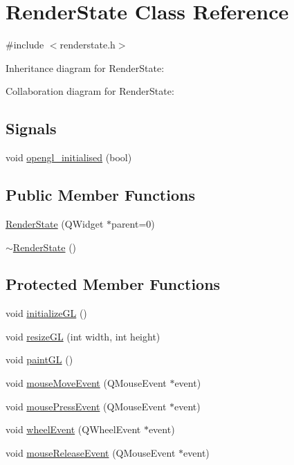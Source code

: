 \hypertarget{class_render_state}{}\section{Render\+State Class Reference}
\label{class_render_state}


{\ttfamily \#include $<$renderstate.\+h$>$}



Inheritance diagram for Render\+State\+:


Collaboration diagram for Render\+State\+:
\subsection*{Signals}
\begin{DoxyCompactItemize}
\item 
void \hyperlink{class_render_state_a1218388c554d57a0d0f3329fb598c52c}{opengl\+\_\+initialised} (bool)
\end{DoxyCompactItemize}
\subsection*{Public Member Functions}
\begin{DoxyCompactItemize}
\item 
\hyperlink{class_render_state_a0c7560ba40ab88540f36d8447cee295b}{Render\+State} (Q\+Widget $\ast$parent=0)
\item 
\hyperlink{class_render_state_ad6b1f19c42de824752214fc4cd06c54d}{$\sim$\+Render\+State} ()
\end{DoxyCompactItemize}
\subsection*{Protected Member Functions}
\begin{DoxyCompactItemize}
\item 
void \hyperlink{class_render_state_abe3bb1279e73c96866ebcc15e36ea159}{initialize\+G\+L} ()
\item 
void \hyperlink{class_render_state_a25c89dd98861a87cbc66244248de73da}{resize\+G\+L} (int width, int height)
\item 
void \hyperlink{class_render_state_aeb38d8c35ce4faf6d9dfa4980750ab14}{paint\+G\+L} ()
\item 
void \hyperlink{class_render_state_a2251c5ca3b49732711e5f60a3903a50a}{mouse\+Move\+Event} (Q\+Mouse\+Event $\ast$event)
\item 
void \hyperlink{class_render_state_a2ae988257a9b66495785dbc0500c20c1}{mouse\+Press\+Event} (Q\+Mouse\+Event $\ast$event)
\item 
void \hyperlink{class_render_state_a191d743f572a890bcaf2893bc1d33251}{wheel\+Event} (Q\+Wheel\+Event $\ast$event)
\item 
void \hyperlink{class_render_state_a6639eee55e4e158313d2ea08c9ebfd96}{mouse\+Release\+Event} (Q\+Mouse\+Event $\ast$event)
\end{DoxyCompactItemize}


